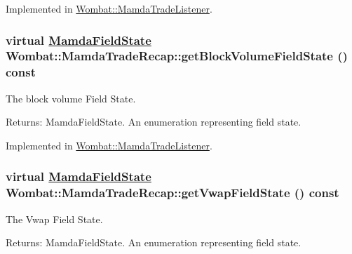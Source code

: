 Implemented in \hyperlink{classWombat_1_1MamdaTradeListener_0fd74766b284afb545bd976dc7c84060}{Wombat::Mamda\-Trade\-Listener}.\hypertarget{classWombat_1_1MamdaTradeRecap_f39bf8db19885374b44a37a6b36311b1}{
\subsubsection[getBlockVolumeFieldState]{\setlength{\rightskip}{0pt plus 5cm}virtual \hyperlink{namespaceWombat_93aac974f2ab713554fd12a1fa3b7d2a}{Mamda\-Field\-State} Wombat::Mamda\-Trade\-Recap::get\-Block\-Volume\-Field\-State () const}}
\label{classWombat_1_1MamdaTradeRecap_f39bf8db19885374b44a37a6b36311b1}


The block volume Field State. 

\begin{Desc}
\item[Returns:]Mamda\-Field\-State. An enumeration representing field state. \end{Desc}


Implemented in \hyperlink{classWombat_1_1MamdaTradeListener_4bff1adf74e14f18819160029796fa9d}{Wombat::Mamda\-Trade\-Listener}.\hypertarget{classWombat_1_1MamdaTradeRecap_4a05775b568f16662fdcf8f34f5cecde}{
\subsubsection[getVwapFieldState]{\setlength{\rightskip}{0pt plus 5cm}virtual \hyperlink{namespaceWombat_93aac974f2ab713554fd12a1fa3b7d2a}{Mamda\-Field\-State} Wombat::Mamda\-Trade\-Recap::get\-Vwap\-Field\-State () const}}
\label{classWombat_1_1MamdaTradeRecap_4a05775b568f16662fdcf8f34f5cecde}


The Vwap Field State. 

\begin{Desc}
\item[Returns:]Mamda\-Field\-State. An enumeration representing field state. \end{Desc}


